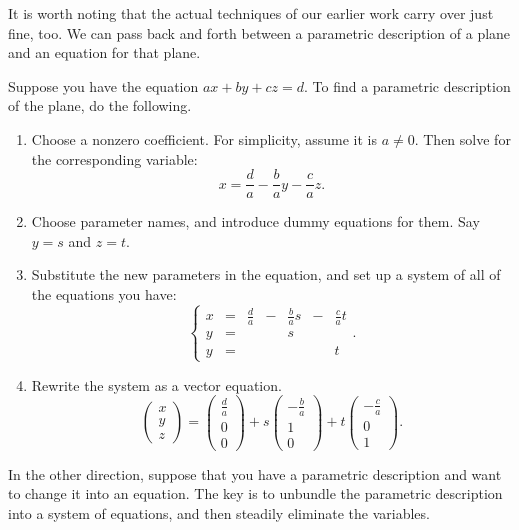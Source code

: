 \documentclass[00-livre-main.tex]{subfiles}
\begin{document}
It is worth noting that the actual techniques of our earlier work carry over just fine, too. We can pass back and forth between a parametric description of a plane and an equation for that plane.

Suppose you have the equation $ax+by+cz = d$. To find a parametric description of the plane, do the following.
\begin{enumerate}
\item Choose a nonzero coefficient. For simplicity, assume it is $a\neq 0$. Then solve 
for the corresponding variable:
\[
x  = \frac{d}{a} - \frac{b}{a} y - \frac{c}{a} z.
\]

\item Choose parameter names, and introduce dummy equations for them. Say $y=s$ and $z=t$.

\item Substitute the new parameters in the equation, and set up a system of all of the equations you have:
\[
\left\{ \begin{array}{rrrrrrr}
x  &=& \frac{d}{a} &-& \frac{b}{a} s &-& \frac{c}{a} t \\
y  &=&             & &             s & &  \\
y  &=&             & &               & & t 
\end{array}\right. .
\]

\item Rewrite the system as a vector equation.
\[
\begin{pmatrix} x \\ y \\ z \end{pmatrix} = 
\begin{pmatrix} \frac{d}{a} \\ 0 \\ 0 \end{pmatrix} + 
s\begin{pmatrix} -\frac{b}{a} \\ 1 \\ 0 \end{pmatrix} +
t\begin{pmatrix} -\frac{c}{a} \\ 0 \\ 1 \end{pmatrix} .
\]
\end{enumerate}

In the other direction, suppose that you have a parametric description and want to change it into an equation. The key is to unbundle the parametric description into a system of equations, and then steadily eliminate the variables.
\end{document}
